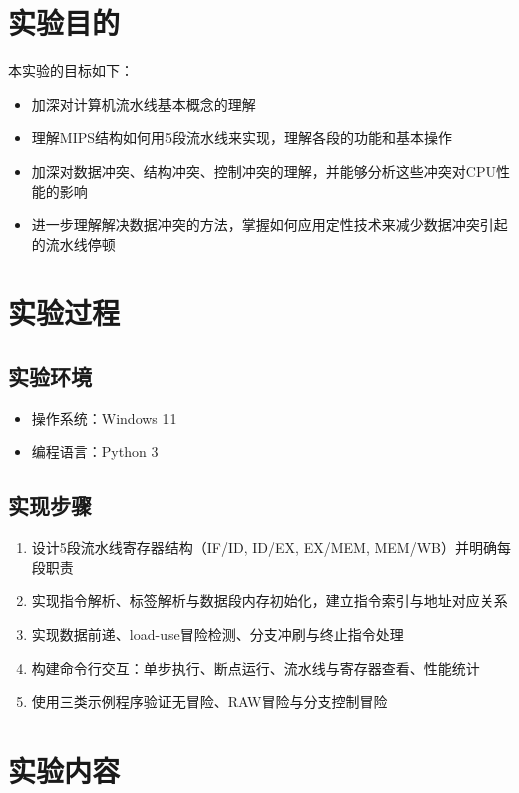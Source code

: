 \documentclass[12pt,a4paper]{ctexart}
\title{\reporttitle}
\author{\authname：\underline{李祥熙} \quad \authid：\underline{2234412799}}
\date{\today}
\begin{document}
\maketitle

\section{实验目的}
本实验的目标如下：
\begin{itemize}
	\item 加深对计算机流水线基本概念的理解
	\item 理解MIPS结构如何用5段流水线来实现，理解各段的功能和基本操作
	\item 加深对数据冲突、结构冲突、控制冲突的理解，并能够分析这些冲突对CPU性能的影响
	\item 进一步理解解决数据冲突的方法，掌握如何应用定性技术来减少数据冲突引起的流水线停顿
\end{itemize}

\section{实验过程}
\subsection{实验环境}
\begin{itemize}
	\item 操作系统：Windows 11
	\item 编程语言：Python 3
\end{itemize}

\subsection{实现步骤}
\begin{enumerate}
	\item 设计5段流水线寄存器结构（IF/ID, ID/EX, EX/MEM, MEM/WB）并明确每段职责
	\item 实现指令解析、标签解析与数据段内存初始化，建立指令索引与地址对应关系
	\item 实现数据前递、load-use冒险检测、分支冲刷与终止指令处理
	\item 构建命令行交互：单步执行、断点运行、流水线与寄存器查看、性能统计
	\item 使用三类示例程序验证无冒险、RAW冒险与分支控制冒险
\end{enumerate}

\section{实验内容}
\end{document}
